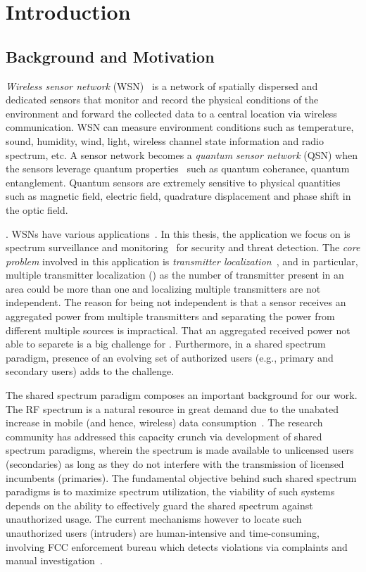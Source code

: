 \chapter{Introduction}
\label{chap:intro}

\section{Background and Motivation}

\emph{Wireless sensor network} (WSN)~\cite{wsn_survey} is a network of spatially dispersed and dedicated sensors that monitor and record the 
physical conditions of the environment and forward the collected data to a central location via wireless communication.
WSN can measure environment conditions such as temperature, sound, humidity, wind, light, wireless channel state information and radio spectrum, etc.
A sensor network becomes a \emph{quantum sensor network} (QSN) when the sensors leverage quantum properties~\cite{RevModPhys.quantumsensing}
such as quantum coherance, quantum entanglement.
Quantum sensors are extremely sensitive to physical quantities such as magnetic field, electric field, quadrature displacement
and phase shift in the optic field.

. WSNs have various applications~\cite{tsn17-water,sensys10-health,mobicom03-sensor}.
In this thesis, the application we focus on is spectrum surveillance and monitoring~\cite{arani2018} for security and threat detection.
The \emph{core problem} involved in this application is \emph{transmitter localization}~\cite{ton-sensorselect,caitao2023qsn}, and in particular, multiple transmitter localization (\mtl) as 
the number of transmitter present in an area could be more than one and localizing multiple transmitters are not independent.
The reason for being not independent is that a sensor receives an aggregated power from multiple transmitters and separating 
the power from different multiple sources is impractical.
That an aggregated received power not able to separete is a big challenge for \mtl.
Furthermore, in a shared spectrum paradigm, presence of an evolving set of authorized users 
(e.g., primary and secondary users) adds to the challenge.

The shared spectrum paradigm composes an important background for our \mtl work.
The RF spectrum is a natural resource in great demand due to the unabated increase in mobile (and hence, wireless) data consumption~\cite{Jeffrey14}. 
The research community has addressed this capacity crunch via development of shared spectrum paradigms, wherein the spectrum 
is made available to unlicensed users (secondaries) as long as they do not interfere with the transmission of licensed incumbents (primaries).
The fundamental objective behind such shared spectrum paradigms is to maximize spectrum utilization,
the viability of such systems depends on the ability to effectively guard the shared spectrum against unauthorized usage. 
The current mechanisms however to locate such unauthorized users (intruders) are human-intensive and time-consuming, 
involving FCC enforcement bureau which detects violations via complaints and manual investigation~\cite{mobicom17-splot}. 


